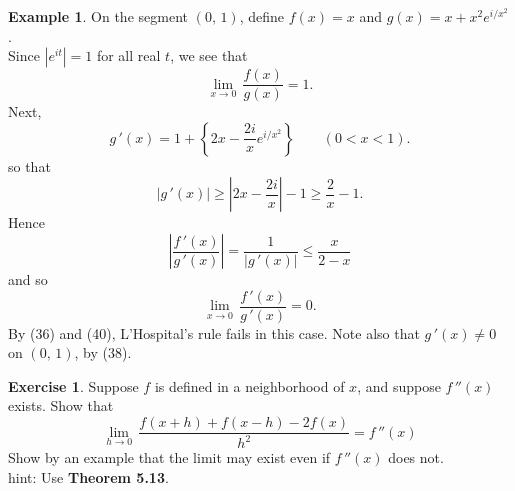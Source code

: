 \documentclass[12pt]{book}
\theoremstyle{definition}
\newtheorem{example}{Example}
\newtheorem{exercise}{Exercise}
\begin{document}
		\begin{example}
			On the segment $(0,\,1)$, define $f(x)=x$ and $g(x)=x+x^2 e^{i/x^2}$.\\
			Since $\left|e^{it}\right|=1$ for all real $t$, we see that
			\begin{equation}\tag{36}
				\lim_{x\rightarrow0}\,\dfrac{f(x)}{g(x)}=1.
			\end{equation}
			Next,\begin{equation*}
				g\,'(x)=1+\left\{2x-\dfrac{2i}{x}e^{i/x^2}\right\}\qquad (0<x<1).
			\end{equation*}
			so that
			\begin{equation}\tag{38}
				|g\,'(x)|\geq\left|2x-\dfrac{2i}{x}\right|-1\geq\dfrac{2}{x}-1.
			\end{equation}
			Hence\begin{equation*}
				\left|\dfrac{f\,'(x)}{g\,'(x)}\right|=\dfrac{1}{|g\,'(x)|}\leq\dfrac{x}{2-x}
			\end{equation*}
			and so
			\begin{equation}\tag{40}
				\lim_{x\rightarrow0}\,\dfrac{f\,'(x)}{g\,'(x)}=0.
			\end{equation}
			By (36) and (40), L'Hospital's rule fails in this case. Note also that $g\,'(x)\neq 0$ on $(0,\,1)$, by (38).\\
		\end{example}
		\newpage
		\begin{exercise}
			Suppose $f$ is defined in a neighborhood of $x$, and suppose $f\,''(x)$ exists. Show that
			\begin{equation*}
				\lim_{h\rightarrow0}\,\dfrac{f(x+h)+f(x-h)-2f(x)}{h^2}=f\,''(x)
			\end{equation*}
			Show by an example that the limit may exist even if $f\,''(x)$ does not.\\
			hint: Use \textbf{Theorem 5.13}.
		\end{exercise}
\end{document}
